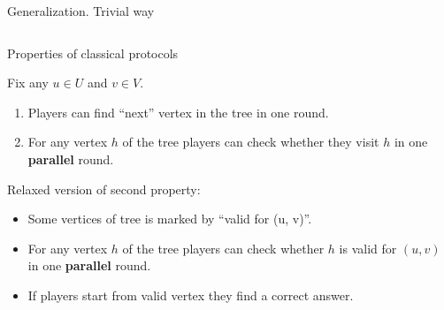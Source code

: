 \begin{frame}{Generalization. Trivial way}

	\pause
    \begin{columns}[t]
		\begin{column}{0.6\textwidth}
            
            \vspace{0.3cm}

        \end{column}
        
		\begin{column}{0.25\textwidth}
            
		\end{column}
	\end{columns}

\end{frame}

\begin{frame}{Properties of classical protocols}

    Fix any $u \in U$ and $v \in V$.

    \pause
    \begin{enumerate}
        \item Players can find ``next'' vertex in the tree in one round.
        \item For any vertex $h$ of the tree players can check whether they visit $h$ in one
            \textbf{parallel} round.
    \end{enumerate}

    \pause
    Relaxed version of second property:
    \begin{itemize}
        \item Some vertices of tree is marked by ``valid for (u, v)''.
        \item For any vertex $h$ of the tree players can check whether $h$ is valid for $(u, v)$ in one
            \textbf{parallel} round.
        \item If players start from valid vertex they find a correct answer.
    \end{itemize}
    
\end{frame}

